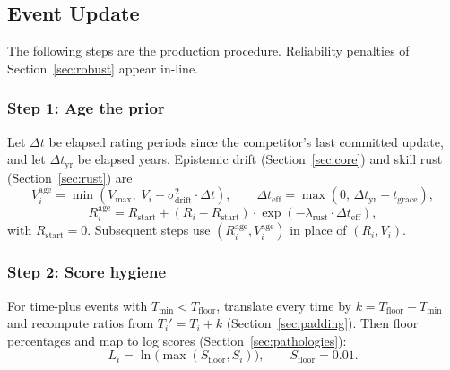 \documentclass[12pt]{article}
\newcommand{\vmax}{V_{\mathrm{max}}}
\newcommand{\sdrift}{\sigma_{\mathrm{drift}}^2}
\newcommand{\tfloor}{T_{\mathrm{floor}}}
\newcommand{\lambdar}{\lambda_{\mathrm{rust}}}
\newcommand{\tgrace}{t_{\mathrm{grace}}}
\newcommand{\tmin}{T_{\mathrm{min}}}
\begin{document}
	\subsection{Event Update}
	The following steps are the production procedure. Reliability penalties of Section~\ref{sec:robust} appear in-line.

	\subsubsection*{Step 1: Age the prior}
	Let $\Delta t$ be elapsed rating periods since the competitor's last committed update, and let $\Delta t_{\mathrm{yr}}$ be elapsed years. Epistemic drift (Section~\ref{sec:core}) and skill rust (Section~\ref{sec:rust}) are
	\begin{equation}
		V_i^{\mathrm{age}} = \min(\vmax,\; V_i + \sdrift \cdot \Delta t), \qquad
		\Delta t_{\mathrm{eff}} = \max(0,\, \Delta t_{\mathrm{yr}} - \tgrace),
	\end{equation}
	\begin{equation}
		R_i^{\mathrm{age}} = R_{\mathrm{start}} + (R_i - R_{\mathrm{start}}) \cdot \exp(-\lambdar \cdot \Delta t_{\mathrm{eff}}),
	\end{equation}
	with $R_{\mathrm{start}} = 0$. Subsequent steps use $(R_i^{\mathrm{age}}, V_i^{\mathrm{age}})$ in place of $(R_i, V_i)$.

	\subsubsection*{Step 2: Score hygiene}
	For time-plus events with $\tmin < \tfloor$, translate every time by $k = \tfloor - \tmin$ and recompute ratios from $T_i' = T_i + k$ (Section~\ref{sec:padding}). Then floor percentages and map to log scores (Section~\ref{sec:pathologies}):
	\begin{equation}
		L_i = \ln\bigl(\max(S_{\mathrm{floor}}, S_i)\bigr), \qquad S_{\mathrm{floor}} = 0.01.
	\end{equation}
\end{document}
